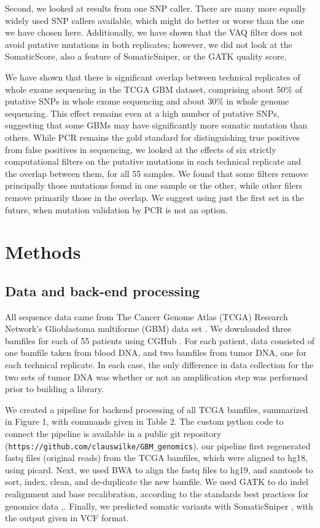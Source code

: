 \documentclass[11pt]{article} %
\begin{document}
Second, we looked at results from one SNP caller. There are many more equally widely used SNP callers available, which might do better or worse than the one we have chosen here. Additionally, we have shown that the VAQ filter does not avoid putative mutations in both replicates; however, we did not look at the SomaticScore, also a feature of SomaticSniper, or the GATK quality score. 

We have shown that there is significant overlap between technical replicates of whole exome sequencing in the TCGA GBM dataset, comprising about 50\% of putative SNPs in whole exome sequencing and about 30\% in whole genome sequencing. This effect remains even at a high number of putative SNPs, suggesting that some GBMs may have significantly more somatic mutation than others. While PCR remains the gold standard for distinguishing true positives from false positives in sequencing, we looked at the effects of six strictly computational filters on the putative mutations in each technical replicate and the overlap between them, for all 55 samples. We found that some filters remove principally those mutations found in one sample or the other, while other filers remove primarily those in the overlap. We suggest using just the first set in the future, when mutation validation by PCR is not an option.

\section*{Methods}

\subsection{Data and back-end processing}

All sequence data came from The Cancer Genome Atlas (TCGA) Research Network's Glioblastoma multiforme (GBM) data set \cite{TCGA-GBM}. We downloaded three bamfiles for each of 55 patients using CGHub \cite{CGHub}. For each patient, data consisted of one bamfile taken from blood DNA, and two bamfiles from tumor DNA, one for each technical replicate. In each case, the only difference in data collection for the two sets of tumor DNA was whether or not an amplification step was performed prior to building a library. 

We created a pipeline for backend processing of all TCGA bamfiles, summarized in Figure 1, with commands given in Table 2. The custom python code to connect the pipeline is available in a public 
git repository (\texttt{https://github.com/clauswilke/GBM\_genomics}). our pipeline first regenerated fastq files (original reads) from the TCGA bamfiles, which were aligned to hg18, using picard. Next, we used BWA to align the fastq files to hg19, and samtools to sort, index, clean, and de-duplicate the new bamfile. We used GATK to do indel realignment and base recalibration, according to the standards best practices for genomics data \cite{best-practices},. Finally, we predicted somatic variants with SomaticSniper \cite{SomaticSniper}, with the output given in VCF format.
\end{document}
